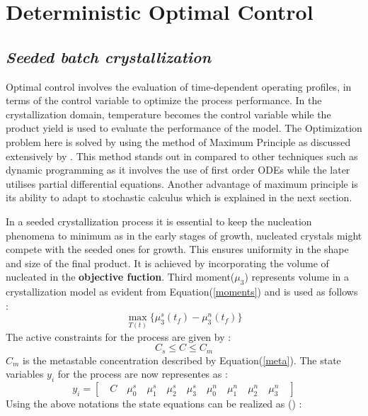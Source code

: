 \documentclass[3p,times,authoryear]{elsarticle}
\begin{document}
\section{Deterministic Optimal Control}\label{secdet}

\subsection{\textit{Seeded batch crystallization}}
Optimal control involves the evaluation of time-dependent operating profiles, in terms of the control variable to optimize the process performance. In the crystallization domain, temperature becomes the control variable while the product yield is used to evaluate the performance of the model. The Optimization problem here is solved by using the method of Maximum Principle as discussed extensively by \cite{diwekar}. This method stands out in compared to other techniques such as dynamic programming as it involves the use of first order ODEs while the later utilises partial differential equations. Another advantage of maximum principle is its ability to adapt to stochastic calculus which is explained in the next section. \par 
In a seeded crystallization process it is essential to keep the nucleation phenomena to minimum as in the early stages of growth, nucleated crystals might compete with the seeded ones for growth. This ensures uniformity in the shape and size of the final product. It is achieved by incorporating the volume of nucleated in the \textbf{objective fuction}. Third moment($\mu_{3}$) represents volume in a crystallization model as evident from Equation(\ref{moments}) and is used as follows :
\begin{equation}
\max_{T(t)}\lbrace{\mu_{3}^{s}(t_{f}) - \mu_{3}^{n}(t_{f})\rbrace } 
\end{equation}
The active constraints for the process are given by : 
\begin{equation}
C_{s}\leqslant C \leqslant C_{m}
\end{equation}
$C_{m}$ is the metastable concentration described by Equation(\ref{meta}). The state variables $y_{i}$ for the process are now representes as : 
\begin{equation} \label{states}
y_{i} = \left[\quad C \quad \mu_{0}^{s} \quad \mu_{1}^{s}\quad \mu_{2}^{s}\quad \mu_{3}^{s}\quad \mu_{0}^{n}\quad \mu_{1}^{n}\quad \mu_{2}^{n}\quad \mu_{3}^{n}\quad\right]  
\end{equation}
Using the above notations the state equations can be realized as (\cite{yenkie}) :
\end{document}
